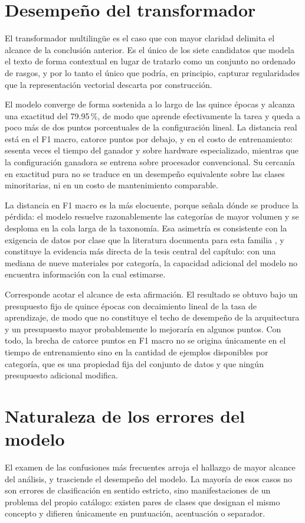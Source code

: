 \section{Desempeño del transformador}
El transformador multilingüe es el caso que con mayor claridad delimita el alcance de la conclusión anterior. Es el único de los siete candidatos que modela el texto de forma contextual en lugar de tratarlo como un conjunto no ordenado de rasgos, y por lo tanto el único que podría, en principio, capturar regularidades que la representación vectorial descarta por construcción.

El modelo converge de forma sostenida a lo largo de las quince épocas y alcanza una exactitud del 79.95\,\%, de modo que aprende efectivamente la tarea y queda a poco más de dos puntos porcentuales de la configuración lineal. La distancia real está en el F1 macro, catorce puntos por debajo, y en el costo de entrenamiento: sesenta veces el tiempo del ganador y sobre hardware especializado, mientras que la configuración ganadora se entrena sobre procesador convencional. Su cercanía en exactitud pura no se traduce en un desempeño equivalente sobre las clases minoritarias, ni en un costo de mantenimiento comparable.

La distancia en F1 macro es la más elocuente, porque señala dónde se produce la pérdida: el modelo resuelve razonablemente las categorías de mayor volumen y se desploma en la cola larga de la taxonomía. Esa asimetría es consistente con la exigencia de datos por clase que la literatura documenta para esta familia \cite{vaswani2017}, y constituye la evidencia más directa de la tesis central del capítulo: con una mediana de nueve materiales por categoría, la capacidad adicional del modelo no encuentra información con la cual estimarse.

Corresponde acotar el alcance de esta afirmación. El resultado se obtuvo bajo un presupuesto fijo de quince épocas con decaimiento lineal de la tasa de aprendizaje, de modo que no constituye el techo de desempeño de la arquitectura y un presupuesto mayor probablemente lo mejoraría en algunos puntos. Con todo, la brecha de catorce puntos en F1 macro no se origina únicamente en el tiempo de entrenamiento sino en la cantidad de ejemplos disponibles por categoría, que es una propiedad fija del conjunto de datos y que ningún presupuesto adicional modifica.

\section{Naturaleza de los errores del modelo}
El examen de las confusiones más frecuentes arroja el hallazgo de mayor alcance del análisis, y trasciende el desempeño del modelo. La mayoría de esos casos no son errores de clasificación en sentido estricto, sino manifestaciones de un problema del propio catálogo: existen pares de clases que designan el mismo concepto y difieren únicamente en puntuación, acentuación o separador.

